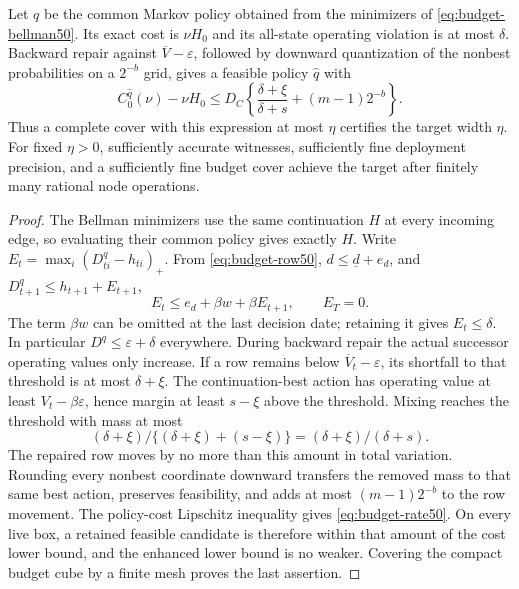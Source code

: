 \begin{theorem}\label{thm:budget-completion50}
Let $q$ be the common Markov policy obtained from the minimizers of \eqref{eq:budget-bellman50}. Its exact cost is $\nu H_0$ and its all-state operating violation is at most $\delta$. Backward repair against $\overline V-\varepsilon$, followed by downward quantization of the nonbest probabilities on a $2^{-b}$ grid, gives a feasible policy $\widehat q$ with
\begin{equation}\label{eq:budget-rate50}
 C_0^{\widehat q}(\nu)-\nu H_0
 \le D_C\left\{\frac{\delta+\xi}{\delta+s}+(m-1)2^{-b}\right\}.
\end{equation}
Thus a complete cover with this expression at most $\eta$ certifies the target width $\eta$. For fixed $\eta>0$, sufficiently accurate witnesses, sufficiently fine deployment precision, and a sufficiently fine budget cover achieve the target after finitely many rational node operations.
\end{theorem}
\begin{proof}
The Bellman minimizers use the same continuation $H$ at every incoming edge, so evaluating their common policy gives exactly $H$. Write $E_t=\max_i(D^q_{ti}-h_{ti})_+$. From \eqref{eq:budget-row50}, $d\le\underline d+e_d$, and $D^q_{t+1}\le h_{t+1}+E_{t+1}$,
\[
 E_t\le e_d+\beta w+\beta E_{t+1},\qquad E_T=0.
\]
The term $\beta w$ can be omitted at the last decision date; retaining it gives $E_t\le\delta$. In particular $D^q\le\varepsilon+\delta$ everywhere. During backward repair the actual successor operating values only increase. If a row remains below $\overline V_t-\varepsilon$, its shortfall to that threshold is at most $\delta+\xi$. The continuation-best action has operating value at least $V_t-\beta\varepsilon$, hence margin at least $s-\xi$ above the threshold. Mixing reaches the threshold with mass at most
\[
 (\delta+\xi)/\{(\delta+\xi)+(s-\xi)\}
 = (\delta+\xi)/(\delta+s).
\]
The repaired row moves by no more than this amount in total variation. Rounding every nonbest coordinate downward transfers the removed mass to that same best action, preserves feasibility, and adds at most $(m-1)2^{-b}$ to the row movement. The policy-cost Lipschitz inequality gives \eqref{eq:budget-rate50}. On every live box, a retained feasible candidate is therefore within that amount of the cost lower bound, and the enhanced lower bound is no weaker. Covering the compact budget cube by a finite mesh proves the last assertion.\end{proof}

